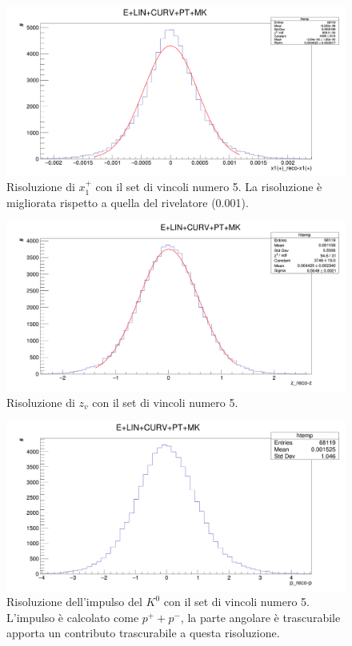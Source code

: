 \documentclass[8pt]{extarticle}
\begin{document}
\begin{figure}
	\begin{center}
		\includegraphics[scale=0.25]{set_5_x} 
		\caption{Risoluzione di $x_1^+$ con il set di vincoli numero 5. La risoluzione è migliorata rispetto a quella del rivelatore (0.001).}
		\label{fig:set_5_x}
	\end{center}
\end{figure}

\begin{figure}
	\begin{center}
		\includegraphics[scale=0.25]{set_5_z} 
		\caption{Risoluzione di $z_v$ con il set di vincoli numero 5.}
		\label{fig:set_5_z}
	\end{center}
\end{figure}

\begin{figure}
	\begin{center}
		\includegraphics[scale=0.25]{set_5_p} 
		\caption{Risoluzione dell'impulso del $K^0$ con il set di vincoli numero 5. L'impulso è calcolato come $p^+ + p^-$, la parte angolare è trascurabile apporta un contributo trascurabile a questa risoluzione.}
		\label{fig:set_5_p}
	\end{center}
\end{figure}
\end{document}

